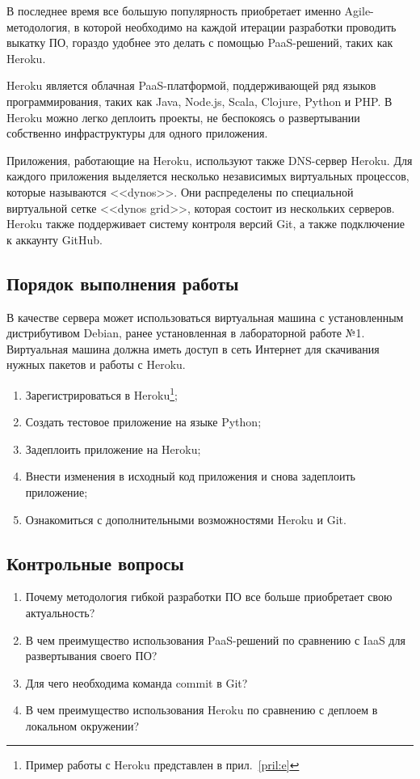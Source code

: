 В последнее время все большую популярность приобретает именно Agile-методология, в которой необходимо на каждой итерации разработки проводить выкатку ПО, гораздо удобнее это делать с помощью PaaS-решений, таких как Heroku.

Heroku является облачная PaaS-платформой, поддерживающей ряд языков программирования, таких как Java, Node.js, Scala, Clojure, Python и PHP.
В Heroku можно легко деплоить проекты, не беспокоясь о развертывании собственно инфраструктуры для одного приложения.

Приложения, работающие на Heroku, используют также DNS-сервер Heroku.
Для каждого приложения выделяется несколько независимых виртуальных процессов, которые называются <<dynos>>.
Они распределены по специальной виртуальной сетке <<dynos grid>>, которая состоит из нескольких серверов.
Heroku также поддерживает систему контроля версий Git, а также подключение к аккаунту GitHub.

\subsection{Порядок выполнения работы}

В качестве сервера может использоваться виртуальная машина с установленным дистрибутивом Debian, ранее установленная в лабораторной работе №1.
Виртуальная машина должна иметь доступ в сеть Интернет для скачивания нужных пакетов и работы с Heroku.

\begin{enumerate}
    \item Зарегистрироваться в Heroku\footnote{Пример работы с Heroku представлен в прил.~\ref{pril:e}};
    \item Создать тестовое приложение на языке Python;
    \item Задеплоить приложение на Heroku;
    \item Внести изменения в исходный код приложения и снова задеплоить приложение;
    \item Ознакомиться с дополнительными возможностями Heroku и Git.
\end{enumerate}

\subsection{Контрольные вопросы}
\begin{enumerate}
    \item Почему методология гибкой разработки ПО все больше приобретает свою актуальность?
    \item В чем преимущество использования PaaS-решений по сравнению с IaaS для развертывания своего ПО?
    \item Для чего необходима команда commit в Git?
    \item В чем преимущество использования Heroku по сравнению с деплоем в локальном окружении?
\end{enumerate}

\clearpage
